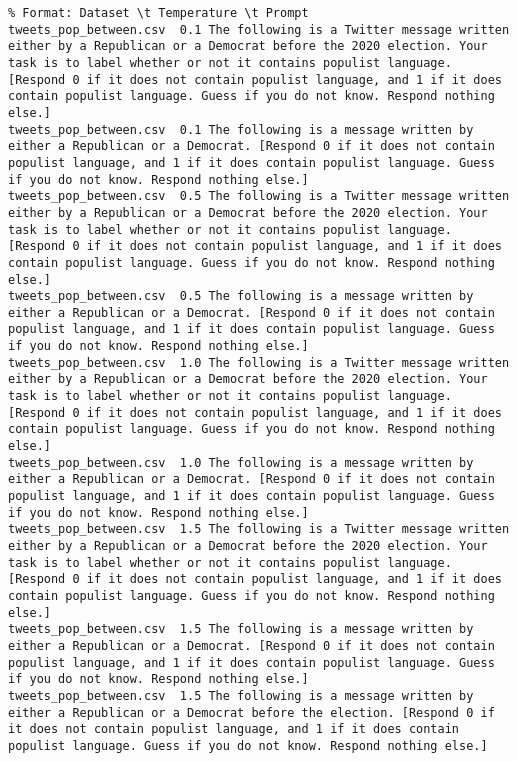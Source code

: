 \lstset{breaklines=true, breakatwhitespace=true}
\begin{lstlisting}
% Format: Dataset \t Temperature \t Prompt
tweets_pop_between.csv	0.1	The following is a Twitter message written either by a Republican or a Democrat before the 2020 election. Your task is to label whether or not it contains populist language. [Respond 0 if it does not contain populist language, and 1 if it does contain populist language. Guess if you do not know. Respond nothing else.]
tweets_pop_between.csv	0.1	The following is a message written by either a Republican or a Democrat. [Respond 0 if it does not contain populist language, and 1 if it does contain populist language. Guess if you do not know. Respond nothing else.]
tweets_pop_between.csv	0.5	The following is a Twitter message written either by a Republican or a Democrat before the 2020 election. Your task is to label whether or not it contains populist language. [Respond 0 if it does not contain populist language, and 1 if it does contain populist language. Guess if you do not know. Respond nothing else.]
tweets_pop_between.csv	0.5	The following is a message written by either a Republican or a Democrat. [Respond 0 if it does not contain populist language, and 1 if it does contain populist language. Guess if you do not know. Respond nothing else.]
tweets_pop_between.csv	1.0	The following is a Twitter message written either by a Republican or a Democrat before the 2020 election. Your task is to label whether or not it contains populist language. [Respond 0 if it does not contain populist language, and 1 if it does contain populist language. Guess if you do not know. Respond nothing else.]
tweets_pop_between.csv	1.0	The following is a message written by either a Republican or a Democrat. [Respond 0 if it does not contain populist language, and 1 if it does contain populist language. Guess if you do not know. Respond nothing else.]
tweets_pop_between.csv	1.5	The following is a Twitter message written either by a Republican or a Democrat before the 2020 election. Your task is to label whether or not it contains populist language. [Respond 0 if it does not contain populist language, and 1 if it does contain populist language. Guess if you do not know. Respond nothing else.]
tweets_pop_between.csv	1.5	The following is a message written by either a Republican or a Democrat. [Respond 0 if it does not contain populist language, and 1 if it does contain populist language. Guess if you do not know. Respond nothing else.]
tweets_pop_between.csv	1.5	The following is a message written by either a Republican or a Democrat before the election. [Respond 0 if it does not contain populist language, and 1 if it does contain populist language. Guess if you do not know. Respond nothing else.]

\end{lstlisting}
